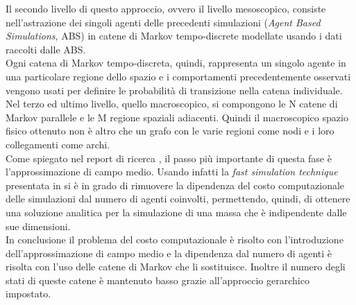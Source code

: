 Il secondo livello di questo approccio, ovvero il livello mesoscopico, consiste nell'astrazione dei singoli agenti delle precedenti simulazioni (\textit{Agent Based Simulations}, ABS) in catene di Markov tempo-discrete modellate usando i dati raccolti dalle ABS.\\
Ogni catena di Markov tempo-discreta, quindi, rappresenta un singolo agente in una particolare regione dello spazio e i comportamenti precedentemente osservati vengono usati per definire le probabilità di transizione nella catena individuale.\\
Nel terzo ed ultimo livello, quello macroscopico, si compongono le N catene di Markov parallele e le M regione spaziali adiacenti. Quindi il macroscopico spazio fisico ottenuto non è altro che un grafo con le varie regioni come nodi e i loro collegamenti come archi.\\
Come spiegato nel report di ricerca \cite{hierarchical-report}, il passo più importante di questa fase è l'approssimazione di campo medio. Usando infatti la \textit{fast simulation technique} presentata in \cite{mean-field} si è in grado di rimuovere la dipendenza del costo computazionale delle simulazioni dal numero di agenti coinvolti, permettendo, quindi, di ottenere una soluzione analitica per la simulazione di una massa che è indipendente dalle sue dimensioni.\\
In conclusione il problema del costo computazionale è risolto con l'introduzione dell'approssimazione di campo medio e la dipendenza dal numero di agenti è risolta con l'uso delle catene di Markov che li sostituisce. Inoltre il numero degli stati di queste catene è mantenuto basso grazie all'approccio gerarchico impostato.
